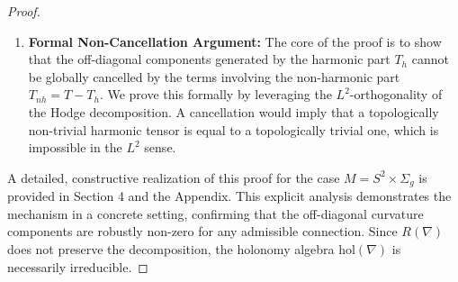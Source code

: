 \documentclass[10pt,a4paper]{amsart}
\begin{document}
\begin{proof}
\begin{enumerate}
    \item \textbf{Formal Non-Cancellation Argument:} The core of the proof is to show that the off-diagonal components generated by the harmonic part $T_h$ cannot be globally cancelled by the terms involving the non-harmonic part $T_{nh} = T - T_h$. We prove this formally by leveraging the $L^2$-orthogonality of the Hodge decomposition. A cancellation would imply that a topologically non-trivial harmonic tensor is equal to a topologically trivial one, which is impossible in the $L^2$ sense.
\end{enumerate}
A detailed, constructive realization of this proof for the case $M=S^2 \times \Sigma_g$ is provided in Section 4 and the Appendix. This explicit analysis demonstrates the mechanism in a concrete setting, confirming that the off-diagonal curvature components are robustly non-zero for any admissible connection. Since $R(\nabla)$ does not preserve the decomposition, the holonomy algebra $\mathrm{hol}(\nabla)$ is necessarily irreducible.
\end{proof}
\end{document}
